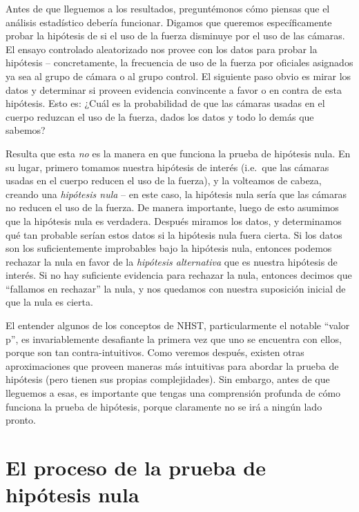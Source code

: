 \documentclass[
  12pt,
]{book}
\begin{document}
Antes de que lleguemos a los resultados, preguntémonos cómo piensas que el análisis estadístico debería funcionar. Digamos que queremos específicamente probar la hipótesis de si el uso de la fuerza disminuye por el uso de las cámaras. El ensayo controlado aleatorizado nos provee con los datos para probar la hipótesis -- concretamente, la frecuencia de uso de la fuerza por oficiales asignados ya sea al grupo de cámara o al grupo control. El siguiente paso obvio es mirar los datos y determinar si proveen evidencia convincente a favor o en contra de esta hipótesis. Esto es: ¿Cuál es la probabilidad de que las cámaras usadas en el cuerpo reduzcan el uso de la fuerza, dados los datos y todo lo demás que sabemos?

Resulta que esta \emph{no} es la manera en que funciona la prueba de hipótesis nula. En su lugar, primero tomamos nuestra hipótesis de interés (i.e.~que las cámaras usadas en el cuerpo reducen el uso de la fuerza), y la volteamos de cabeza, creando una \emph{hipótesis nula} -- en este caso, la hipótesis nula sería que las cámaras no reducen el uso de la fuerza. De manera importante, luego de esto asumimos que la hipótesis nula es verdadera. Después miramos los datos, y determinamos qué tan probable serían estos datos si la hipótesis nula fuera cierta. Si los datos son los suficientemente improbables bajo la hipótesis nula, entonces podemos rechazar la nula en favor de la \emph{hipótesis alternativa} que es nuestra hipótesis de interés. Si no hay suficiente evidencia para rechazar la nula, entonces decimos que ``fallamos en rechazar'' la nula, y nos quedamos con nuestra suposición inicial de que la nula es cierta.

El entender algunos de los conceptos de NHST, particularmente el notable ``valor p'', es invariablemente desafiante la primera vez que uno se encuentra con ellos, porque son tan contra-intuitivos. Como veremos después, existen otras aproximaciones que proveen maneras más intuitivas para abordar la prueba de hipótesis (pero tienen sus propias complejidades). Sin embargo, antes de que lleguemos a esas, es importante que tengas una comprensión profunda de cómo funciona la prueba de hipótesis, porque claramente no se irá a ningún lado pronto.

\hypertarget{el-proceso-de-la-prueba-de-hipuxf3tesis-nula}{%
\section{El proceso de la prueba de hipótesis nula}\label{el-proceso-de-la-prueba-de-hipuxf3tesis-nula}}
\end{document}
